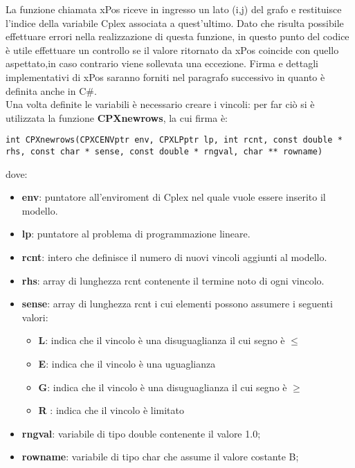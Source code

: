 \documentclass[11pt]{article}
\begin{document}
La funzione chiamata xPos  riceve in ingresso un lato (i,j) del grafo e restituisce l'indice della variabile Cplex associata a quest'ultimo. Dato che risulta possibile effettuare errori nella realizzazione di questa funzione, in questo punto del codice è  utile effettuare un controllo se il valore ritornato da xPos coincide con quello aspettato,in caso contrario viene sollevata una eccezione. Firma e dettagli implementativi di xPos saranno forniti nel paragrafo successivo in quanto è definita anche in C\#.\\

Una volta definite le variabili è necessario creare i vincoli: per far ciò si è utilizzata la funzione \textbf{CPXnewrows}, la cui firma è:

\begin{lstlisting}
int CPXnewrows(CPXCENVptr env, CPXLPptr lp, int rcnt, const double * rhs, const char * sense, const double * rngval, char ** rowname)
\end{lstlisting}

dove:

\begin{itemize}
\item \textbf{env}: puntatore all'enviroment di Cplex nel quale vuole essere inserito il modello.
\item \textbf{lp}: puntatore al problema di programmazione lineare.
\item \textbf{rcnt}: intero che definisce il numero di nuovi vincoli aggiunti al modello.
\item \textbf{rhs}: array di lunghezza rcnt contenente il termine noto di ogni vincolo.
\item \textbf{sense}: array di lunghezza rcnt i cui elementi possono assumere i seguenti valori:

\begin{itemize}
\item \textbf{L}: indica che il vincolo è una disuguaglianza il cui segno è  $\leq$
\item \textbf{E}: indica che il vincolo è una uguaglianza
\item \textbf{G}: indica che il vincolo è una disuguaglianza il cui segno è $\geq$
\item \textbf{R} : indica che il vincolo è limitato 
\end{itemize}

\item \textbf{rngval}: variabile di tipo double contenente il valore 1.0;
\item \textbf{rowname}: variabile di tipo char che assume il valore costante B;
\end{itemize}
\end{document}
